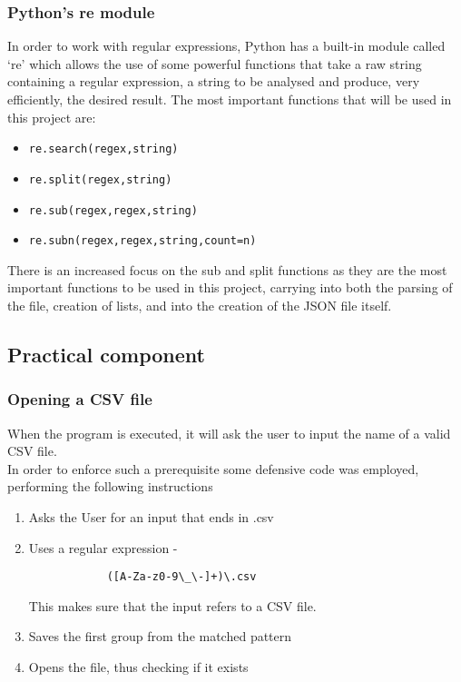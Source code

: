 \documentclass[11pt,a4paper,times]{report}
\begin{document}
\subsubsection*{Python's re module}In order to work with regular
expressions, Python has a built-in module called `re' which allows the
use of some powerful functions that take a raw string containing a
regular expression, a string to be analysed and produce, very
efficiently, the desired result. The most important functions that will 
be used in this project are:
\begin{itemize}
    \item{\verb|re.search(regex,string)|}
    \item{\verb|re.split(regex,string)|}
    \item{\verb|re.sub(regex,regex,string)|}
    \item{\verb|re.subn(regex,regex,string,count=n)|}
\end{itemize}
There is an increased focus on the sub and split functions as they are
the most important functions to be used in this project, carrying into
both the parsing of the file, creation of lists, and into the creation of the JSON
file itself.
\subsection{Practical component} \label{practice}

\subsubsection*{Opening a CSV file} When the program is executed, it will
ask the user to input the name of a valid CSV file. \\ In order to
enforce such a prerequisite some defensive code was employed, performing
the following instructions
\begin{enumerate}
    \item{Asks the User for an input that ends in .csv}
    \item{Uses a regular expression - 
        \begin{verbatim}
            ([A-Za-z0-9\_\-]+)\.csv
        \end{verbatim}
    This makes sure that the input refers to a CSV file.}
    \item{Saves the first group from the matched pattern}
    \item{Opens the file, thus checking if it exists}
\end{enumerate}
\end{document}
